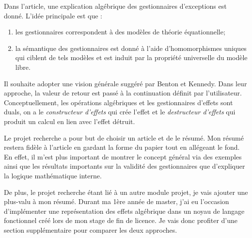 	Dans l'article, une explication algébrique des gestionnaires d'exceptions est donné. L'idée principale est que :
	\begin{enumerate}
		\item les gestionnaires correspondent à des modèles de théorie équationnelle;
		\item la sémantique des gestionnaires est donné à l'aide d'homomorphismes uniques qui ciblent de tels modèles et est induit par la propriété universelle du modèle libre. 
	\end{enumerate}

	Il souhaite adopter une vision générale suggéré par Benton et Kennedy. Dans leur approche, la valeur de retour est passé à la continuation définit par l'utilisateur.
	Conceptuellement, les opérations algébriques et les gestionnaires d'effets sont duals, on a le \textit{constructeur d'effets} qui crée l'effet et le \textit{destructeur d'effets} qui produit un calcul en lien avec l'effet détruit.
	\smallbreak
	
	Le projet recherche a pour but de choisir un article et de le résumé. Mon résumé restera fidèle à l'article en gardant
	la forme du papier tout en allégeant le fond. En effet, il m'est plus important de montrer le concept général via des exemples ainsi
	que les résultats importants sur la validité des gestionnaires que d'expliquer la logique mathématique interne.

	De plus, le projet recherche étant lié à un autre module projet, je vais ajouter une plus-valu à mon résumé. Durant ma 
	1ère année de master, j'ai eu l'occasion d'implémenter une représentation des effets algébrique dans un noyau de langage fonctionnel créé lors de mon stage de fin de licence. Je vais donc profiter d'une section supplémentaire pour comparer les deux approches.
	
	